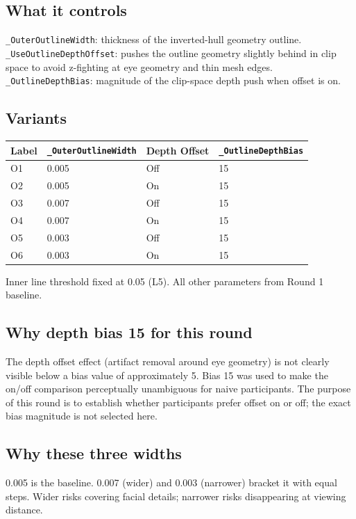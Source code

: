 \documentclass[11pt,a4paper]{article}
\newcommand{\prop}[1]{\texttt{#1}}
\begin{document}
\subsection*{What it controls}
\prop{\_OuterOutlineWidth}: thickness of the inverted-hull geometry outline.\\
\prop{\_UseOutlineDepthOffset}: pushes the outline geometry slightly behind in clip space to avoid z-fighting at eye geometry and thin mesh edges.\\
\prop{\_OutlineDepthBias}: magnitude of the clip-space depth push when offset is on.

\subsection*{Variants}

\begin{tabular}{llll}
\toprule
\textbf{Label} & \prop{\_OuterOutlineWidth} & \textbf{Depth Offset} & \prop{\_OutlineDepthBias} \\
\midrule
O1 & 0.005 & Off & 15 \\
O2 & 0.005 & On  & 15 \\
O3 & 0.007 & Off & 15 \\
O4 & 0.007 & On  & 15 \\
O5 & 0.003 & Off & 15 \\
O6 & 0.003 & On  & 15 \\
\bottomrule
\end{tabular}

\smallskip
\noindent Inner line threshold fixed at 0.05 (L5). All other parameters from Round 1 baseline.

\subsection*{Why depth bias 15 for this round}
The depth offset effect (artifact removal around eye geometry) is not clearly visible below a bias value of approximately 5. Bias 15 was used to make the on/off comparison perceptually unambiguous for naive participants. The purpose of this round is to establish whether participants prefer offset on or off; the exact bias magnitude is not selected here.

\subsection*{Why these three widths}
0.005 is the baseline. 0.007 (wider) and 0.003 (narrower) bracket it with equal steps. Wider risks covering facial details; narrower risks disappearing at viewing distance.
\end{document}
